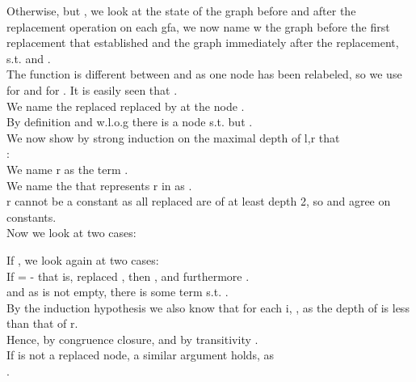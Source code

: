 \begin{theorem}
Otherwise,  but , we look at the state of the graph before and after the replacement operation on each gfa, we now name w the graph before the first \GFA{} replacement that established  and  the graph immediately after the replacement, s.t.  and .\\
The  function is different between  and  as one node has been relabeled, so we use  for  and  for . It is easily seen that .\\
We name the replaced \GFA{}  replaced by  at the node .\\
By definition and w.l.o.g there is a node  s.t.  but .\\
We now show by strong induction on the maximal depth of l,r that\\
 :\\
We name r as the term .\\
We name the \GFA{} that represents r in  as .\\
r cannot be a constant as all \GFAs{} replaced are of at least depth 2, so  and  agree on constants.\\
Now we look at two cases:

If , we look again at two cases:\\
If = - that is,  replaced , then , 
and furthermore .\\
and as  is not empty, there is some term  s.t. .\\
By the induction hypothesis we also know that for each i, , as the depth of  is less than that of r.\\
Hence, by congruence closure,  and by transitivity .\\
If  is not a replaced node, a similar argument holds, as \\
.


\end{theorem}
